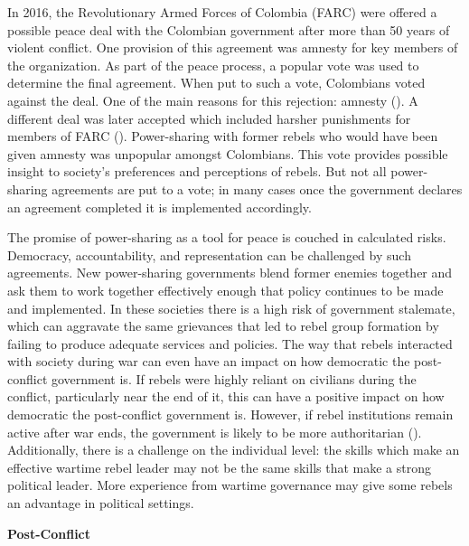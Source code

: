 \documentclass[12pt,]{article}
\begin{document}
In 2016, the Revolutionary Armed Forces of Colombia (FARC) were offered
a possible peace deal with the Colombian government after more than 50
years of violent conflict. One provision of this agreement was amnesty
for key members of the organization. As part of the peace process, a
popular vote was used to determine the final agreement. When put to such
a vote, Colombians voted against the deal. One of the main reasons for
this rejection: amnesty (\citet{shifter_will_2016}). A different deal
was later accepted which included harsher punishments for members of
FARC (\citet{katkov_colombias_2016}). Power-sharing with former rebels
who would have been given amnesty was unpopular amongst Colombians. This
vote provides possible insight to society's preferences and perceptions
of rebels. But not all power-sharing agreements are put to a vote; in
many cases once the government declares an agreement completed it is
implemented accordingly.

The promise of power-sharing as a tool for peace is couched in
calculated risks. Democracy, accountability, and representation can be
challenged by such agreements. New power-sharing governments blend
former enemies together and ask them to work together effectively enough
that policy continues to be made and implemented. In these societies
there is a high risk of government stalemate, which can aggravate the
same grievances that led to rebel group formation by failing to produce
adequate services and policies. The way that rebels interacted with
society during war can even have an impact on how democratic the
post-conflict government is. If rebels were highly reliant on civilians
during the conflict, particularly near the end of it, this can have a
positive impact on how democratic the post-conflict government is.
However, if rebel institutions remain active after war ends, the
government is likely to be more authoritarian
(\citet{huang_wartime_2016}). Additionally, there is a challenge on the
individual level: the skills which make an effective wartime rebel
leader may not be the same skills that make a strong political leader.
More experience from wartime governance may give some rebels an
advantage in political settings.

\textbf{Post-Conflict}
\end{document}
